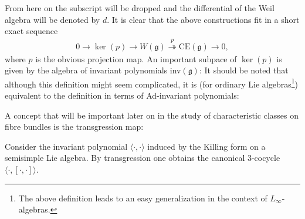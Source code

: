     From here on the subscript will be dropped and the differential of the Weil algebra will be denoted by $d$. It is clear that the above constructions fit in a short exact sequence
    \begin{gather}
        \label{lie:weil_algebra_sequence}
        0\rightarrow\ker(p)\rightarrow W(\mathfrak{g})\overset{p}{\twoheadrightarrow}\text{CE}(\mathfrak{g})\rightarrow0,
    \end{gather}
    where $p$ is the obvious projection map. An important subpace of $\ker(p)$ is given by the algebra of invariant polynomials inv$(\mathfrak{g})$:
    It should be noted that although this definition might seem complicated, it is (for ordinary Lie algebras\footnote{The above definition leads to an easy generalization in the context of $L_\infty$-algebras.}) equivalent to the definition in terms of Ad-invariant polynomials:

    A concept that will be important later on in the study of characteristic classes on fibre bundles is the transgression map:
    \begin{example}\label{lie:killing_transgression}
        Consider the invariant polynomial $\langle\cdot,\cdot\rangle$ induced by the Killing form on a semisimple Lie algebra. By transgression one obtains the canonical 3-cocycle $\langle\cdot, [\cdot,\cdot]\rangle$.
    \end{example}